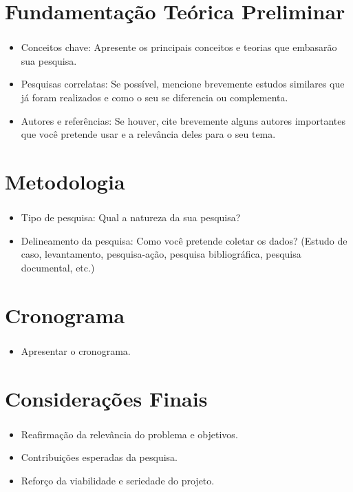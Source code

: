 \documentclass[aspectratio=169]{beamer}
\begin{document}
\section{Fundamentação Teórica Preliminar}

\begin{frame}[fragile]
	\frametitle{\secname}
	\begin{itemize}
		\item Conceitos chave: Apresente os principais conceitos e teorias que embasarão sua pesquisa.
		\item Pesquisas correlatas: Se possível, mencione brevemente estudos similares que já foram realizados e como o seu se diferencia ou complementa.
		\item Autores e referências: Se houver, cite brevemente alguns autores importantes que você pretende usar e a relevância deles para o seu tema.
	\end{itemize}
\end{frame}

\section{Metodologia}

\begin{frame}[fragile]
	\frametitle{\secname}
	\begin{itemize}
		\item Tipo de pesquisa: Qual a natureza da sua pesquisa? 
		\item Delineamento da pesquisa: Como você pretende coletar os dados? (Estudo de caso, levantamento, pesquisa-ação, pesquisa bibliográfica, pesquisa documental, etc.)
	\end{itemize}
\end{frame}

\section{Cronograma}

\begin{frame}[fragile]
	\frametitle{\secname}
	\begin{itemize}
		\item Apresentar o cronograma.
	\end{itemize}
\end{frame}

\section{Considerações Finais}

\begin{frame}[fragile]
	\frametitle{\secname}
	\begin{itemize}
		\item Reafirmação da relevância do problema e objetivos.
		\item Contribuições esperadas da pesquisa.
		\item Reforço da viabilidade e seriedade do projeto.
	\end{itemize}
\end{frame}
\end{document}
